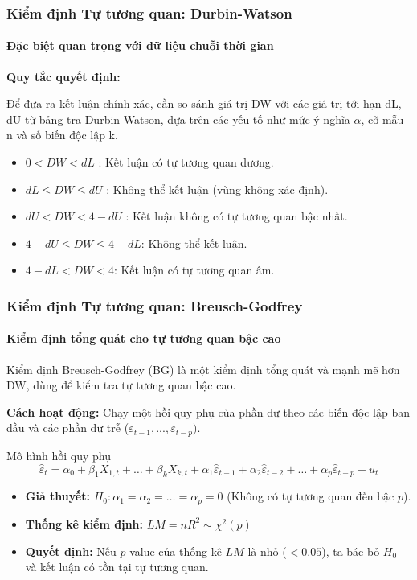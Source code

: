 \begin{frame}
    \frametitle{Kiểm định Tự tương quan: Durbin-Watson}
    \framesubtitle{Đặc biệt quan trọng với dữ liệu chuỗi thời gian}
    \textbf{Quy tắc quyết định:}
    
    Để đưa ra kết luận chính xác, cần so sánh giá trị DW với các giá trị tới hạn dL, dU từ bảng tra Durbin-Watson, dựa trên các yếu tố như mức ý nghĩa $\alpha$, cỡ mẫu n và số biến độc lập k. 
    \begin{itemize}
        \item $0 < DW < dL$ : Kết luận có tự tương quan dương.
        \item $dL \le DW \le dU$ : Không thể kết luận (vùng không xác định).
        \item $dU < DW < 4 - dU$ : Kết luận không có tự tương quan bậc nhất.
        \item $4 - dU \le DW \le 4 - dL$: Không thể kết luận.
        \item $4 - dL < DW < 4$: Kết luận có tự tương quan âm.
    \end{itemize}
\end{frame}

\begin{frame}
    \frametitle{Kiểm định Tự tương quan: Breusch-Godfrey}
    \framesubtitle{Kiểm định tổng quát cho tự tương quan bậc cao}

    Kiểm định Breusch-Godfrey (BG) là một kiểm định tổng quát và mạnh mẽ hơn DW, dùng để kiểm tra tự tương quan bậc cao.
    
    \textbf{Cách hoạt động:} Chạy một hồi quy phụ của phần dư theo các biến độc lập ban đầu và các phần dư trễ ($\varepsilon_{t-1},...,\varepsilon_{t-p})$.
    
    \begin{block}{Mô hình hồi quy phụ}
    \setlength{\abovedisplayskip}{0pt}
        \[
        \widehat{\varepsilon}_t = \alpha_0 + \beta_1 X_{1,t} + \ldots + \beta_k X_{k,t} + \alpha_1 \widehat{\varepsilon}_{t-1} + \alpha_2 \widehat{\varepsilon}_{t-2} + \ldots + \alpha_p \widehat{\varepsilon}_{t-p} + u_t
        \]
    \end{block}
    
    \begin{itemize}
        \item \textbf{Giả thuyết:} $H_0: \alpha_1 = \alpha_2 = \ldots = \alpha_p = 0$ (Không có tự tương quan đến bậc $p$).
        \item \textbf{Thống kê kiểm định:} $LM = nR^2 \sim \chi^2(p)$
        \item \textbf{Quyết định:} Nếu $p$-value của thống kê $LM$ là nhỏ ($< 0.05$), ta bác bỏ $H_0$ và kết luận có tồn tại tự tương quan.
    \end{itemize}
\end{frame}


